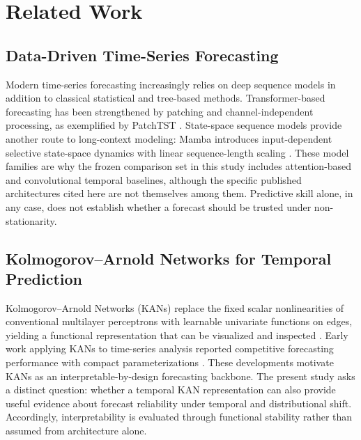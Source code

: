 \section{Related Work}
\label{sec:related}

\subsection{Data-Driven Time-Series Forecasting}
Modern time-series forecasting increasingly relies on deep sequence models in addition to classical statistical and tree-based methods. Transformer-based forecasting has been strengthened by patching and channel-independent processing, as exemplified by PatchTST \cite{nie2022patchtst}. State-space sequence models provide another route to long-context modeling: Mamba introduces input-dependent selective state-space dynamics with linear sequence-length scaling \cite{gu2023mamba}. These model families are why the frozen comparison set in this study includes attention-based and convolutional temporal baselines, although the specific published architectures cited here are not themselves among them. Predictive skill alone, in any case, does not establish whether a forecast should be trusted under non-stationarity.

\subsection{Kolmogorov--Arnold Networks for Temporal Prediction}
Kolmogorov--Arnold Networks (KANs) replace the fixed scalar nonlinearities of conventional multilayer perceptrons with learnable univariate functions on edges, yielding a functional representation that can be visualized and inspected \cite{liu2025kan}. Early work applying KANs to time-series analysis reported competitive forecasting performance with compact parameterizations \cite{vacarubio2024kan}. These developments motivate KANs as an interpretable-by-design forecasting backbone. The present study asks a distinct question: whether a temporal KAN representation can also provide useful evidence about forecast reliability under temporal and distributional shift. Accordingly, interpretability is evaluated through functional stability rather than assumed from architecture alone.

